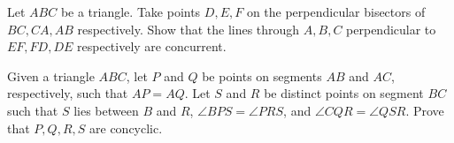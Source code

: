 \begin{problem}[USAMO 1997/2]
Let $ABC$ be a triangle. Take points $D, E, F$ on the
perpendicular bisectors of $BC, CA, AB$ respectively. Show that the lines through $A, B, C$
perpendicular to $EF , F D, DE$ respectively are concurrent.
	\begin{hint}
		\addhint{}
		\addhint{}	
	\end{hint}
\end{problem}

\begin{problem}[USAJMO 2012/1]
Given a triangle $ABC$, let $P$ and $Q$ be points on segments
$AB$ and $AC$, respectively, such that $AP = AQ$. Let $S$ and $R$ be distinct points on segment
$BC$ such that $S$ lies between $B$ and $R$, $\angle BPS = \angle PRS$, and $\angle CQR = \angle QSR$. Prove
that $P , Q, R, S$ are concyclic.
	\begin{hint}
		\addhint{}
		\addhint{}	
	\end{hint}
\end{problem}



